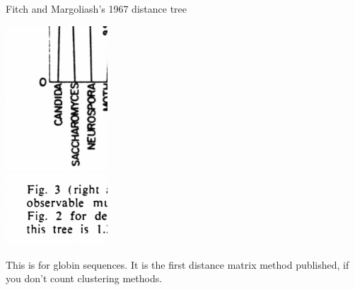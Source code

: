 \documentclass[bluish,slideColor,colorBG,pdf]{prosper}
\begin{document}
\begin{slide}[Replace]{Fitch and Margoliash's 1967 distance tree}

\begin{center}
\includegraphics[width=1.5in]{fitchtree.ps}\\
\includegraphics[width=1.5in]{fitchcaption.ps}\\
\end{center}

This is for globin sequences.  It is the first distance matrix method
published, if you don't count clustering methods.

\end{slide}
\end{document}
